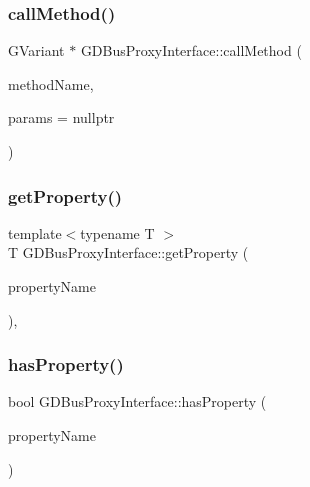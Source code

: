 \subsubsection{\texorpdfstring{call\+Method()}{callMethod()}}
{\footnotesize\ttfamily G\+Variant $\ast$ G\+D\+Bus\+Proxy\+Interface\+::call\+Method (\begin{DoxyParamCaption}\item[{const char $\ast$}]{method\+Name,  }\item[{G\+Variant $\ast$}]{params = {\ttfamily nullptr} }\end{DoxyParamCaption})\hspace{0.3cm}{\ttfamily [protected]}}

\mbox{\label{classGDBusProxyInterface_a3256b66ee5c124db6df45aa85ad620a7}} 
\subsubsection{\texorpdfstring{get\+Property()}{getProperty()}}
{\footnotesize\ttfamily template$<$typename T $>$ \\
T G\+D\+Bus\+Proxy\+Interface\+::get\+Property (\begin{DoxyParamCaption}\item[{const char $\ast$}]{property\+Name }\end{DoxyParamCaption})\hspace{0.3cm}{\ttfamily [inline]}, {\ttfamily [protected]}}

\mbox{\label{classGDBusProxyInterface_a797ba1ae2a746b4bcbd6b3606f4e0b02}} 
\subsubsection{\texorpdfstring{has\+Property()}{hasProperty()}}
{\footnotesize\ttfamily bool G\+D\+Bus\+Proxy\+Interface\+::has\+Property (\begin{DoxyParamCaption}\item[{const char $\ast$}]{property\+Name }\end{DoxyParamCaption})\hspace{0.3cm}{\ttfamily [protected]}}


